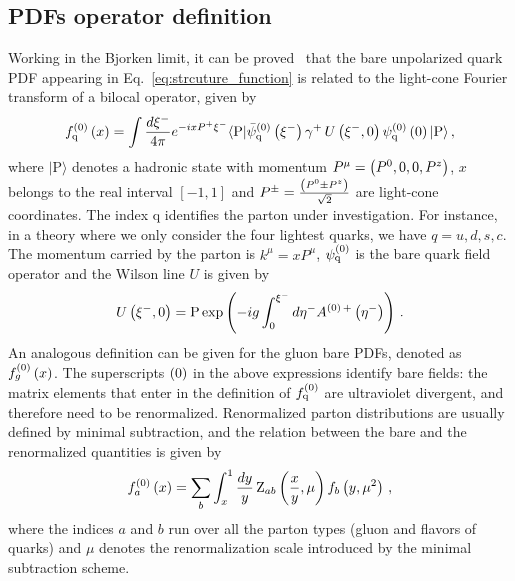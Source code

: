 \subsection{PDFs operator definition}
\label{sec:PDFsdef}
Working in the Bjorken limit, it can be proved~\cite{Collins:1980ui,Collins:1981uw} that the bare unpolarized 
quark PDF appearing in Eq.~\eqref{eq:strcuture_function} is related to the light-cone Fourier transform 
of a bilocal operator, given by
\begin{align}
	\label{eq::barepdf}                                                  
	f_\mathrm{q}^{(0)}\left( x \right) = \int \frac{d\xi^-}{4\pi} e^{-ixP^+\xi^-} 
	\langle \text{P}|\bar{\psi}_\mathrm{q}^{(0)}\left(\xi^-\right)\gamma^+ \,   
	U\left(\xi^-,0\right) \psi_\mathrm{q}^{(0)}\left( 0\right)  |\text{P}\rangle\, ,   
\end{align}
where $|\text{P}\rangle$ denotes a hadronic state with momentum $P^\mu = \left(
P^0,0,0,P^z\right)$, $x$ belongs to the real interval $\left[-1,1\right]$ and $P^{\pm}=\frac {\left( P^0 \pm P^z \right)}{ \sqrt{2}}$ are
light-cone coordinates. 
The index $\mathrm{q}$ identifies the parton under
investigation. For instance, in a theory where we only consider the four
lightest quarks, we have $q=u,d,s,c$. The momentum carried by the parton is
$k^\mu = x P^\mu$, $\psi_\mathrm{q}^{(0)}$ is the bare quark field operator and the
Wilson line $U$ is given by 
\begin{align}
	\label{eq::wilsonline}                                                      
    U\left(\xi^-,0\right) = \text{P}\exp 
    \left( -ig\int_0^{\xi^-}d\eta^- A^{{(0)}\,+}\left( \eta^- \right) \right)\, .         
\end{align}
An analogous definition can be given for the gluon bare PDFs, denoted as
$f_g^{(0)}\left( x \right)$. The superscripts ${(0)}$ in the above expressions identify
bare fields: the matrix elements that enter in the definition of
$f_\mathrm{q}^{(0)}$ are ultraviolet divergent, and therefore need to be
renormalized.
Renormalized parton distributions are usually defined by minimal
subtraction, and the relation between the bare and the renormalized quantities
is given by
\begin{align}
	\label{eq:RenormPDF}                                   
	f_a^{(0)}\left( x \right) = \sum_{b}\int_x^1\frac{dy}{y}\,\text{Z}_{ab}\left(\frac{x}{y},\mu \right) f_b\left( y,\mu^2 \right)\, , 
\end{align}
where the indices $a$ and $b$ run over all the parton types (gluon and flavors
of quarks) and $\mu$ denotes the renormalization scale introduced by the minimal
subtraction scheme. 


